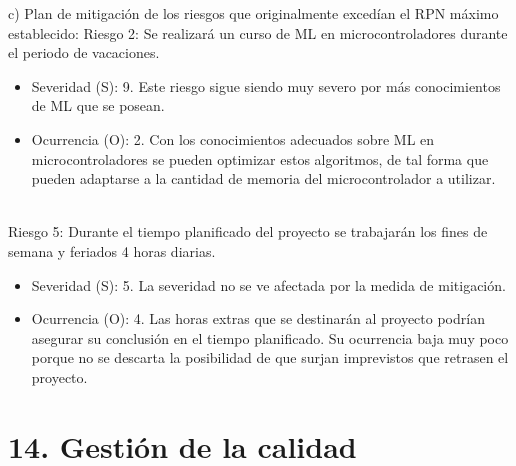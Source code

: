 \documentclass[
11pt, %
]{plan}
\begin{document}
c) Plan de mitigación de los riesgos que originalmente excedían el RPN máximo establecido:
Riesgo 2: Se realizará un curso de ML en microcontroladores durante el periodo de vacaciones.
\begin{itemize}
	\item Severidad (S): 9. Este riesgo sigue siendo muy severo por más conocimientos de ML que se posean.
	\item Ocurrencia (O): 2. Con los conocimientos adecuados sobre ML en microcontroladores se pueden optimizar estos algoritmos, de tal forma que pueden adaptarse a la cantidad de memoria del microcontrolador a utilizar. \\ \\
\end{itemize}
Riesgo 5: Durante el tiempo planificado del proyecto se trabajarán los fines de semana y feriados 4 horas diarias.
\begin{itemize}
	\item Severidad (S): 5. La severidad no se ve afectada por la medida de mitigación.
	\item Ocurrencia (O): 4. Las horas extras que se destinarán al proyecto podrían asegurar su conclusión en el tiempo planificado. Su ocurrencia baja muy poco porque no se descarta la posibilidad de que surjan imprevistos que retrasen el proyecto.
\end{itemize}

\section{14. Gestión de la calidad}
\label{sec:calidad}
\end{document}
